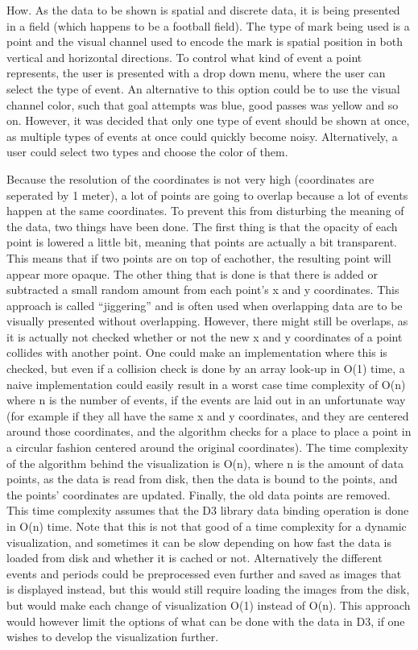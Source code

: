 \documentclass[Report.tex]{subfiles}
\begin{document}
\noindent How. As the data to be shown is spatial and discrete data, it is being presented in a field (which happens to be a football field). The type of mark being used is a point and the visual channel used to encode the mark is spatial position in both vertical and horizontal directions. To control what kind of event a point represents, the user is presented with a drop down menu, where the user can select the type of event. An alternative to this option could be to use the visual channel color, such that goal attempts was blue, good passes was yellow and so on. However, it was decided that only one type of event should be shown at once, as multiple types of events at once could quickly become noisy. Alternatively, a user could select two types and choose the color of them.

Because the resolution of the coordinates is not very high (coordinates are seperated by 1 meter), a lot of points are going to overlap because a lot of events happen at the same coordinates. To prevent this from disturbing the meaning of the data, two things have been done. The first thing is that the opacity of each point is lowered a little bit, meaning that points are actually a bit transparent. This means that if two points are on top of eachother, the resulting point will appear more opaque. The other thing that is done is that there is added or subtracted a small random amount from each point's x and y coordinates. This approach is called ``jiggering'' and is often used when overlapping data are to be visually presented without overlapping. However, there might still be overlaps, as it is actually not checked whether or not the new x and y coordinates of a point collides with another point. One could make an implementation where this is checked, but even if a collision check is done by an array look-up in O(1) time, a naive implementation could easily result in a worst case time complexity of O(n) where n is the number of events, if the events are laid out in an unfortunate way (for example if they all have the same x and y coordinates, and they are centered around those coordinates, and the algorithm checks for a place to place a point in a circular fashion centered around the original coordinates). The time complexity of the algorithm behind the visualization is O(n), where n is the amount of data points, as the data is read from disk, then the data is bound to the points, and the points' coordinates are updated. Finally, the old data points are removed. This time complexity assumes that the D3 library data binding operation is done in O(n) time. Note that this is not that good of a time complexity for a dynamic visualization, and sometimes it can be slow depending on how fast the data is loaded from disk and whether it is cached or not. Alternatively the different events and periods could be preprocessed even further and saved as images that is displayed instead, but this would still require loading the images from the disk, but would make each change of visualization O(1) instead of O(n). This approach would however limit the options of what can be done with the data in D3, if one wishes to develop the visualization further.
\end{document}
